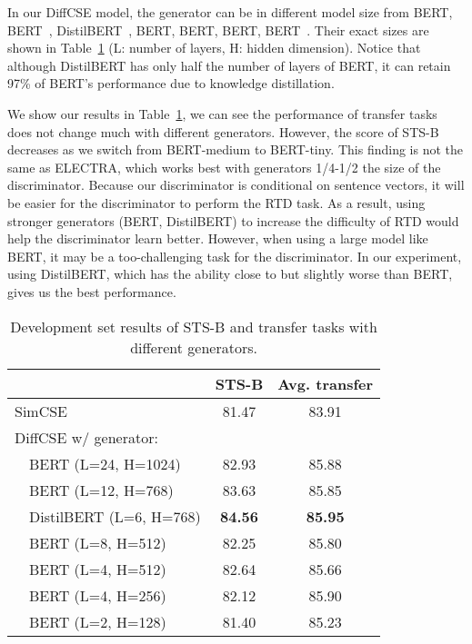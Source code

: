 \documentclass[11pt]{article}
\newcommand{\la}{\xspace}
\newcommand{\ba}{\xspace}
\newcommand\tf[1]{\textbf{#1}}
\begin{document}
In our DiffCSE model, the generator can be in different model size from BERT\la, BERT\ba~\cite{devlin2019bert}, DistilBERT\ba~\cite{sanh2019distilbert}, BERT, BERT, BERT, BERT~\cite{turc2019well}. Their exact sizes are shown in Table~\ref{tab:gsize} (L: number of layers, H: hidden dimension). Notice that although DistilBERT\ba has only half the number of layers of BERT, it can retain 97\% of BERT's performance due to knowledge distillation.

We show our results in Table~\ref{tab:gsize}, we can see the performance of transfer tasks does not change much with different generators. However, the score of STS-B decreases as we switch from BERT-medium to BERT-tiny. This finding is not the same as ELECTRA, which works best with generators 1/4-1/2 the size of the discriminator. Because our discriminator is conditional on sentence vectors, it will be easier for the discriminator to perform the RTD task. As a result, using stronger generators (BERT\ba, DistilBERT\ba) to increase the difficulty of RTD would help the discriminator learn better. However, when using a large model like BERT\la, it may be a too-challenging task for the discriminator. In our experiment, using DistilBERT\ba, which has the ability close to but slightly worse than BERT\ba, gives us the best performance.


\begin{table}[t!]
    \begin{center}
    \centering
    \small
    \begin{tabular}{lcc}
    \toprule
         & \tf{STS-B} & \tf{Avg. transfer} \\
    \midrule
        SimCSE & 81.47 & 83.91 \\
    \midrule
        DiffCSE w/ generator:& & \\
        ~~BERT (L=24, H=1024) & 82.93 & 85.88 \\
        ~~BERT (L=12, H=768) & 83.63 & 85.85 \\
        ~~DistilBERT (L=6, H=768) & \bf 84.56 & \bf 85.95 \\
    \midrule
        ~~BERT (L=8, H=512) & 82.25 & 85.80 \\
        ~~BERT (L=4, H=512)  & 82.64 & 85.66 \\
        ~~BERT (L=4, H=256) & 82.12 & 85.90 \\
        ~~BERT (L=2, H=128) & 81.40 & 85.23 \\
    \bottomrule
    \end{tabular}
    \end{center}
\vspace{-3mm}
    \caption{
        Development set results of STS-B and transfer tasks with different generators. 
    }
    \label{tab:gsize}
    \vspace{-1mm}
\end{table}
\end{document}
